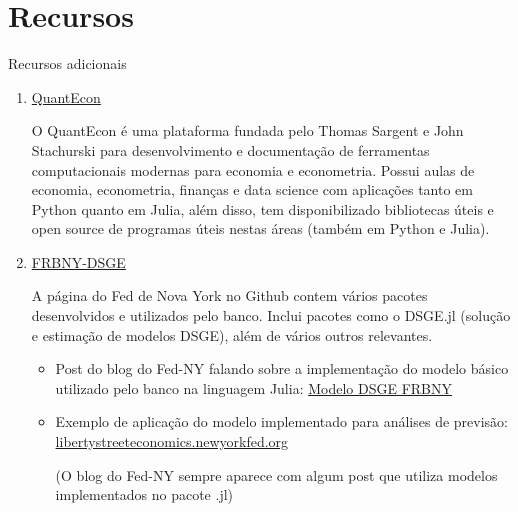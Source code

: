 \documentclass[10pt]{beamer}
\begin{document}
\section{Recursos}
\begin{frame}{Recursos adicionais}
    \begin{enumerate}
        \item \href{https://quantecon.org/}{QuantEcon}\medskip
        
        O QuantEcon é uma plataforma fundada pelo Thomas Sargent e John Stachurski para desenvolvimento e documentação de ferramentas computacionais modernas para economia e econometria. Possui aulas de economia, econometria, finanças e data science com aplicações tanto em Python quanto em Julia, além disso, tem disponibilizado bibliotecas úteis e open source de programas úteis nestas áreas (também em Python e Julia).\medskip

        \item \href{https://github.com/FRBNY-DSGE}{FRBNY-DSGE}
        
        A página do Fed de Nova York no Github contem vários pacotes desenvolvidos e utilizados pelo banco. Inclui pacotes como o DSGE.jl (solução e estimação de modelos DSGE), além de vários outros relevantes.\medskip
        \begin{itemize}
            \item Post do blog do Fed-NY falando sobre a implementação do modelo básico utilizado pelo banco na linguagem Julia: \href{https://libertystreeteconomics.newyorkfed.org/2015/12/the-frbny-dsge-model-meets-julia/}{Modelo DSGE FRBNY}\medskip
            \item Exemplo de aplicação do modelo implementado para análises de previsão: \href{https://libertystreeteconomics.newyorkfed.org/2015/05/the-frbny-dsge-model-forecast-april-2015/}{libertystreeteconomics.newyorkfed.org}
            
            (O blog do Fed-NY sempre aparece com algum post que utiliza modelos implementados no pacote .jl)
        \end{itemize}
    \end{enumerate}
\end{frame}
\end{document}
